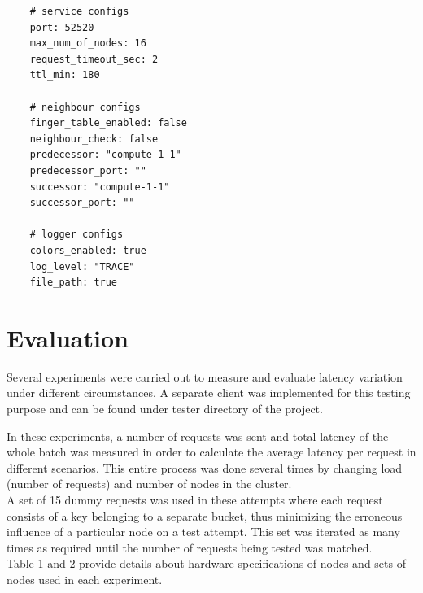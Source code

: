 \documentclass[
    a4paper,
    twocolumn,
]{article}
\begin{document}
\begin{verbatim}
	# service configs
	port: 52520
	max_num_of_nodes: 16
	request_timeout_sec: 2
	ttl_min: 180
	
	# neighbour configs
	finger_table_enabled: false
	neighbour_check: false
	predecessor: "compute-1-1"
	predecessor_port: ""
	successor: "compute-1-1"
	successor_port: ""
	
	# logger configs
	colors_enabled: true
	log_level: "TRACE"
	file_path: true
\end{verbatim}

\section{Evaluation}

Several experiments were carried out to measure and evaluate latency variation under different circumstances. A separate client was implemented for this testing purpose and can be found under tester directory of the project. 

In these experiments, a number of requests was sent and total latency of the whole batch was measured in order to calculate the average latency per request in different scenarios. This entire process was done several times by changing load (number of requests) and number of nodes in the cluster. \\

A set of 15 dummy requests was used in these attempts where each request consists of a key belonging to a separate bucket, thus minimizing the erroneous influence of a particular node on a test attempt. This set was iterated as many times as required until the number of requests being tested was matched.\\

Table 1 and 2 provide details about hardware specifications of nodes and sets of nodes used in each experiment.
\end{document}
